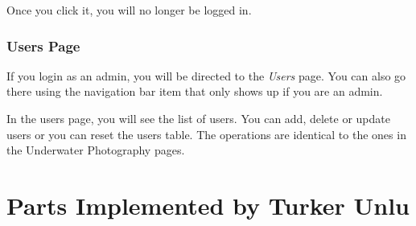 \documentclass[a4paper,10pt,english]{sphinxmanual}
\begin{document}
Once you click it, you will no longer be logged in.


\subsubsection{Users Page}
\label{user/member4:users-page}
If you login as an admin, you will be directed to the \emph{Users} page. You can also go there using the navigation bar item that only shows up if you are an admin.
\begin{quote}

\end{quote}

In the users page, you will see the list of users. You can add, delete or update users or you can reset the users table. The operations are identical to the ones in the Underwater Photography pages.
\begin{quote}

\end{quote}


\section{Parts Implemented by Turker Unlu}
\label{user/member5:parts-implemented-by-turker-unlu}\label{user/member5::doc}
\end{document}
